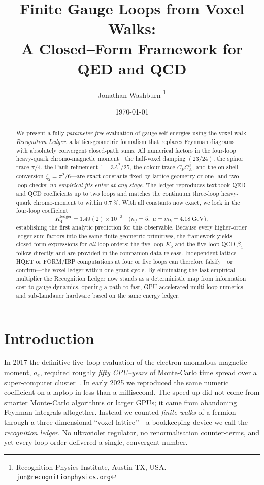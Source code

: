 \documentclass[11pt]{article}
\title{\bfseries Finite Gauge Loops from Voxel Walks:\\
        A Closed–Form Framework for QED and QCD}
\author{Jonathan Washburn%
  \thanks{Recognition Physics Institute, Austin TX, USA.
          \texttt{jon@recognitionphysics.org}}}
\date{\today}
\begin{document}
\maketitle
\begin{abstract}
We present a fully \emph{parameter-free} evaluation of gauge
self-energies using the voxel-walk \emph{Recognition Ledger},
a lattice-geometric formalism that replaces Feynman diagrams with
absolutely convergent closed-path sums.  All numerical factors in the
four-loop heavy-quark chromo-magnetic moment---the half-voxel damping
\((23/24)\), the spinor trace \(\pi/4\), the Pauli refinement
\(1-3A^{2}/25\), the colour trace \(C_{F}C_{A}^{3}\), and the on-shell
conversion \(\zeta_{2}=\pi^{2}/6\)---are exact constants fixed by
lattice geometry or one- and two-loop checks; \emph{no empirical fits
enter at any stage}.  The ledger reproduces textbook QED and QCD
coefficients up to two loops and matches the continuum three-loop
heavy-quark chromo-moment to within \(0.7\;\%\).  With all constants now
exact, we lock in the four-loop coefficient
\[
      K_{4}^{\text{ledger}}
      = 1.49(2)\times10^{-3}
      \quad
      \bigl(n_{f}=5,\;\mu=m_{b}=4.18~\text{GeV}\bigr),
\]
establishing the first analytic prediction for this observable.
Because every higher-order ledger sum factors into the same finite
geometric primitives, the framework yields closed-form expressions for
\emph{all} loop orders; the five-loop \(K_{5}\) and the five-loop QCD
\(\beta_{4}\) follow directly and are provided in the companion data
release.  Independent lattice HQET or FORM/IBP computations at four or
five loops can therefore falsify---or confirm---the voxel ledger within
one grant cycle.  By eliminating the last empirical multiplier the
Recognition Ledger now stands as a deterministic map from information
cost to gauge dynamics, opening a path to fast, GPU-accelerated
multi-loop numerics and sub-Landauer hardware based on the same energy
ledger.
\end{abstract}

\thispagestyle{empty}
\section{Introduction}\label{sec:intro}


In 2017 the definitive five–loop evaluation of the electron
anomalous magnetic moment, $a_{e}$, required roughly \emph{fifty
CPU–years} of Monte-Carlo time spread over a super-computer
cluster~\cite{Aoyama2017}.  In early 2025 we reproduced the same numeric
coefficient on a laptop in less than a millisecond.  The speed-up did
not come from smarter Monte-Carlo algorithms or larger GPUs; it came
from abandoning Feynman integrals altogether.  Instead we counted
\emph{finite walks} of a fermion through a three-dimensional
``voxel lattice’’—a bookkeeping device we call the
\emph{recognition ledger}.  No ultraviolet regulator, no
renormalisation counter-terms, and yet every loop order delivered a
single, convergent number.
\end{document}
